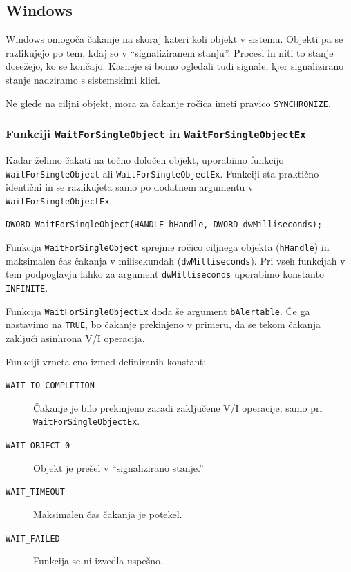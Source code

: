 \documentclass[a4paper,12pt,openright]{book}
\begin{document}
\subsection{Windows} \label{ssec:windows_syscalls:waiting}

Windows omogoča čakanje na skoraj kateri koli objekt v sistemu.
Objekti pa se razlikujejo po tem, kdaj so v ``signaliziranem stanju''.
Procesi in niti to stanje dosežejo, ko se končajo.
Kasneje si bomo ogledali tudi signale, kjer signalizirano stanje nadziramo s sistemskimi klici.

Ne glede na ciljni objekt, mora za čakanje ročica imeti pravico \texttt{SYNCHRONIZE}.

\subsubsection{Funkciji \texttt{WaitForSingleObject} in \texttt{WaitForSingleObjectEx}}

Kadar želimo čakati na točno določen objekt, uporabimo funkcijo \texttt{WaitFor\-SingleObject} ali \texttt{WaitFor\-SingleObjectEx}.
Funkciji sta praktično identični in se razlikujeta samo po dodatnem argumentu v \texttt{WaitForSingleObjectEx}.

\begin{lstlisting}[style=func]
 DWORD WaitForSingleObject(HANDLE hHandle, DWORD dwMilliseconds);
\end{lstlisting}

Funkcija \texttt{WaitForSingleObject} sprejme ročico ciljnega objekta (\texttt{hHandle}) in maksimalen čas čakanja v milisekundah (\texttt{dwMilliseconds}).
Pri vseh funkcijah v tem podpoglavju lahko za argument \texttt{dwMilliseconds} uporabimo konstanto \texttt{INFINITE}.

Funkcija \texttt{WaitForSingleObjectEx} doda še argument \texttt{bAlertable}.
Če ga nastavimo na \texttt{TRUE}, bo čakanje prekinjeno v primeru, da se tekom čakanja zaključi asinhrona V/I operacija.

Funkciji vrneta eno izmed definiranih konstant:
\begin{description}
	\item[\texttt{WAIT\_IO\_COMPLETION}] Čakanje je bilo prekinjeno zaradi zaključene V/I operacije; samo pri \texttt{WaitForSingleObjectEx}.
	\item[\texttt{WAIT\_OBJECT\_0}] Objekt je prešel v ``signalizirano stanje.''
	\item[\texttt{WAIT\_TIMEOUT}] Maksimalen čas čakanja je potekel.
	\item[\texttt{WAIT\_FAILED}] Funkcija se ni izvedla uspešno.
\end{description}
\end{document}
